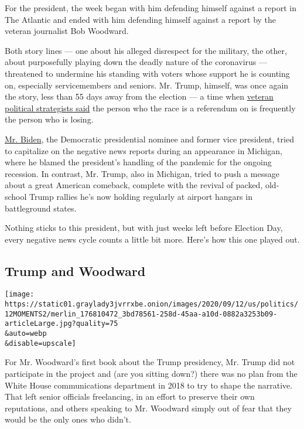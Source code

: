 For the president, the week began with him defending himself against a
report in The Atlantic and ended with him defending himself against a
report by the veteran journalist Bob Woodward.

Both story lines --- one about his alleged disrespect for the military,
the other, about purposefully playing down the deadly nature of the
coronavirus --- threatened to undermine his standing with voters whose
support he is counting on, especially servicemembers and seniors. Mr.
Trump, himself, was once again the story, less than 55 days away from
the election --- a time when
\href{https://www.nytimes3xbfgragh.onion/2020/09/10/us/politics/trump-campaign-virus-woodward.html}{veteran
political strategists said} the person who the race is a referendum on
is frequently the person who is losing.

\href{https://www.nytimes3xbfgragh.onion/interactive/2020/us/elections/joe-biden.html}{Mr.
Biden}, the Democratic presidential nominee and former vice president,
tried to capitalize on the negative news reports during an appearance in
Michigan, where he blamed the president's handling of the pandemic for
the ongoing recession. In contrast, Mr. Trump, also in Michigan, tried
to push a message about a great American comeback, complete with the
revival of packed, old-school Trump rallies he's now holding regularly
at airport hangars in battleground states.

Nothing sticks to this president, but with just weeks left before
Election Day, every negative news cycle counts a little bit more. Here's
how this one played out.

\hypertarget{trump-and-woodward}{%
\subsection{Trump and Woodward}\label{trump-and-woodward}}

\texttt{[image: https://static01.graylady3jvrrxbe.onion/images/2020/09/12/us/politics/12MOMENTS2/merlin\_176810472\_3bd78561-258d-45aa-a10d-0882a3253b09-articleLarge.jpg?quality=75\\\&auto=webp\\\&disable=upscale]}

For Mr. Woodward's first book about the Trump presidency, Mr. Trump did
not participate in the project and (are you sitting down?) there was no
plan from the White House communications department in 2018 to try to
shape the narrative. That left senior officials freelancing, in an
effort to preserve their own reputations, and others speaking to Mr.
Woodward simply out of fear that they would be the only ones who didn't.

